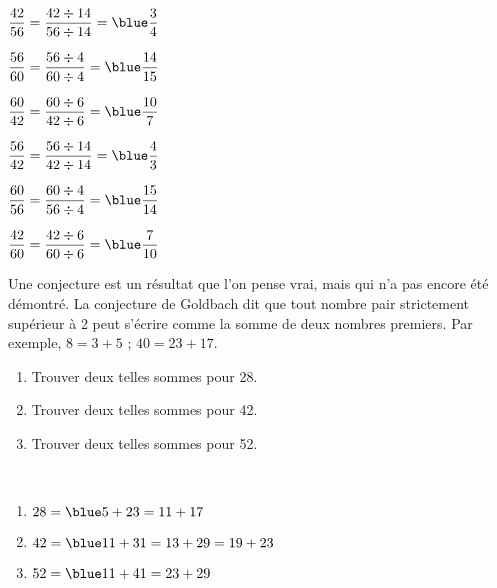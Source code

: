 \begin{colonne*exercice}
\begin{corrige}
\ \\ [-5mm]
    \begin{colenumerate}{2}
       \item $\dfrac{42}{56} =\dfrac{42\div14}{56\div14} ={\blue \dfrac{3}{4}}$ \medskip
       \item $\dfrac{56}{60} =\dfrac{56\div4}{60\div4} ={\blue \dfrac{14}{15}}$ \medskip
       \item $\dfrac{60}{42} =\dfrac{60\div6}{42\div6} ={\blue \dfrac{10}{7}}$
       \item $\dfrac{56}{42} =\dfrac{56\div14}{42\div14} ={\blue \dfrac{4}{3}}$
       \item $\dfrac{60}{56} =\dfrac{60\div4}{56\div4} ={\blue \dfrac{15}{14}}$    
       \item $\dfrac{42}{60} =\dfrac{42\div6}{60\div6} ={\blue \dfrac{7}{10}}$
   \end{colenumerate}
\end{corrige}

\bigskip


\begin{exercice} %
   Une conjecture est un résultat que l'on pense vrai, mais qui n'a pas encore été démontré. La conjecture de Goldbach dit que tout nombre pair strictement supérieur à 2 peut s'écrire comme la somme de deux nombres premiers. Par exemple, $8 =3+5$ ; $40 =23+17$.
   \begin{enumerate}
      \item Trouver deux telles sommes pour 28.
      \item Trouver deux telles sommes pour 42.
      \item Trouver deux telles sommes pour 52.
   \end{enumerate}
\end{exercice}

\begin{corrige}
   \ \\ [-5mm]
   \begin{enumerate}
      \item $28 ={\blue 5+23 =11+17}$ \smallskip
      \item $42 ={\blue 11+31 =13+29 =19+23}$ \smallskip
      \item $52 ={\blue 11+41 = 23+29}$
   \end{enumerate}
\end{corrige}

\medskip



\end{colonne*exercice}
